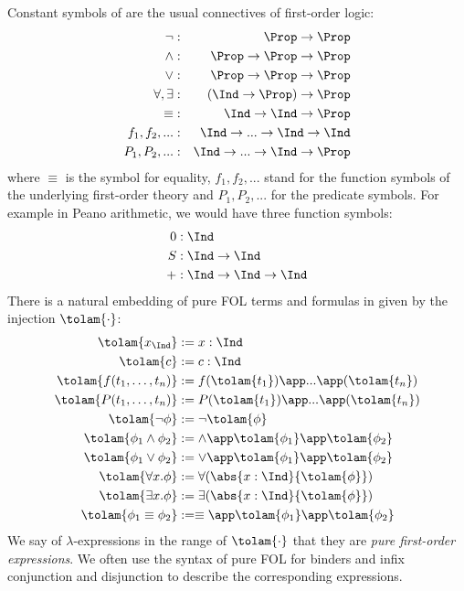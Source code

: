 \begin{definition}[\lamfol]
Constant symbols of \lamfol are the usual connectives of first-order logic:
\begin{align*}
    \neg & : & \Prop \to \Prop \\
    \land & : & \Prop \to \Prop \to \Prop \\
    \lor & : & \Prop \to \Prop \to \Prop \\
    \forall, \exists & : & (\Ind \to \Prop) \to \Prop \\
    \equiv & : & \Ind \to \Ind \to \Prop \\
    f_1, f_2, ... & : & \Ind \to ... \to \Ind \to \Ind \\
    P_1, P_2, ... & : & \Ind \to ... \to \Ind \to \Prop
\end{align*}
where $\equiv$ is the symbol for equality, $f_1, f_2, ...$ stand for the function symbols of the underlying first-order theory and $P_1, P_2, ...$ for the predicate symbols. For example in Peano arithmetic, we would have three function symbols:
\begin{align*}
    0 & : \Ind \\
    S & : \Ind \to \Ind \\
    + & : \Ind \to \Ind \to \Ind
\end{align*}
There is a natural embedding of pure FOL terms and formulas in \lamfol given by the injection $\tolam{\cdot}$:
\begin{align*}
    \tolam{x_{\Ind}} & := x: \Ind \\
    \tolam{c} & := c: \Ind \\
    \tolam{f(t_1, \ldots, t_n)} & := f (\tolam{t_1})\app ...\app (\tolam{t_n}) \\
    \tolam{P(t_1, \ldots, t_n)} & := P (\tolam{t_1})\app ...\app (\tolam{t_n}) \\
    \tolam{\neg \phi} & := \neg \tolam{\phi} \\
    \tolam{\phi_1 \land \phi_2} & := \land\app \tolam{\phi_1}\app \tolam{\phi_2} \\
    \tolam{\phi_1 \lor \phi_2} & := \lor\app \tolam{\phi_1}\app \tolam{\phi_2} \\
    \tolam{\forall x. \phi} & := \forall (\abs{x: \Ind}{\tolam{\phi}}) \\
    \tolam{\exists x. \phi} & := \exists (\abs{x: \Ind}{\tolam{\phi}}) \\
    \tolam{\phi_1 \equiv \phi_2} & := \equiv\app \tolam{\phi_1}\app \tolam{\phi_2}
\end{align*}
We say of $\lambda$-expressions in the range of $\tolam{\cdot}$ that they are \textit{pure first-order expressions}. We often use the syntax of pure FOL for binders and infix conjunction and disjunction to describe the corresponding \lamfol expressions.
\end{definition}

